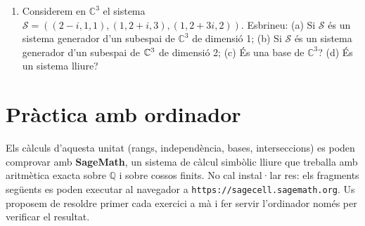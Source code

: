 \begin{enumerate}
b) Considerem els polinomis $t^{2}-5t+2$ i $3t-4$. Es demana: (i) 
Són de $G$? (ii) En cas afirmatiu, trobeu $\alpha ,\beta
,\gamma \in \mathbb{R}$ tals que%
\[
p(t)=\alpha (t+1)+\beta t+\gamma (t-1)
\]%
essent $p(t)$ cadascun dels dos polinomis anteriors. (iii) 
Són aquests $\alpha ,\beta ,\gamma $ únics? En cas
afirmatiu, justificar la resposta. En cas contrari, trobar-los.

c) Calculeu les dimensions i trobeu una base de $F+G$ i $F\cap G$. 
És la suma $F+G$ directa?

d) Trobeu una base d’un complementari de $F+G$ en $\mathbb{R}_{3}\left[ t%
\right] $.

\item Considerem en $\mathbb{C}^{3}$ el sistema $\mathcal{S}=\left(
(2-i,1,1),(1,2+i,3),(1,2+3i,2)\right) $. Esbrineu: (a) Si $\mathcal{S}$ és
un sistema generador d’un subespai de $\mathbb{C}^{3}$ de dimensió
1; (b) Si $\mathcal{S}$ és un sistema generador d’un subespai de $\mathbb{%
C}^{3}$ de dimensió 2; (c) És una base de $\mathbb{C}%
^{3}$? (d) És un sistema lliure?
\end{enumerate}

\section{Pràctica amb ordinador}

Els càlculs d'aquesta unitat (rangs, independència, bases, interseccions) es
poden comprovar amb \textbf{SageMath}, un sistema de càlcul simbòlic lliure
que treballa amb aritmètica exacta sobre $\mathbb{Q}$ i sobre cossos finits.
No cal instal·lar res: els fragments següents es poden executar al navegador
a \texttt{https://sagecell.sagemath.org}. Us proposem de resoldre primer cada
exercici a mà i fer servir l'ordinador només per verificar el resultat.

